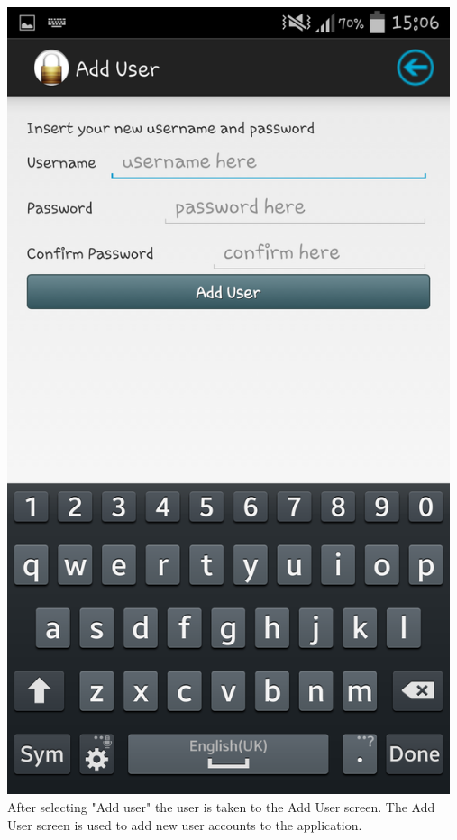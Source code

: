 \begin{center}
 \includegraphics[width=13cm]{screenshots/normal/2_AddUser.png}
After selecting "Add user" the user is taken to the Add User screen. The Add User screen is used to add new user accounts to the application.
\end{center}
